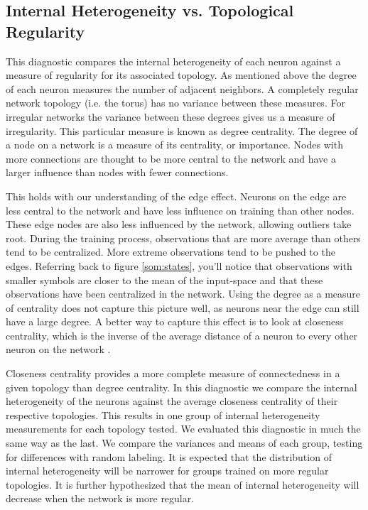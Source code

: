 \subsection{Internal Heterogeneity vs. Topological Regularity}
This diagnostic compares the internal heterogeneity of each neuron against a
measure of regularity for its associated topology.  As mentioned above the
degree of each neuron measures the number of adjacent neighbors.  A completely
regular network topology (i.e. the torus) has no variance between these
measures.  For irregular networks the variance between these degrees gives us
a measure of irregularity. This particular measure is known as degree
centrality.  The degree of a node on a network is a measure of its centrality, or
importance. Nodes with more connections are thought to be more central to the
network and have a larger influence than nodes with fewer connections.

This holds with our understanding of the edge effect.  Neurons on the edge are
less central to the network and have less influence on training than other nodes.  These
edge nodes are also less influenced by the network, allowing outliers take
root.  During the training process, observations that are more average than
others tend to be centralized.  More extreme observations tend to be pushed to
the edges.  Referring back to figure \ref{som:states}, you'll notice
that observations with smaller symbols are closer to the mean of the
input-space and that these observations have been centralized in the network.
Using the degree as a measure of centrality does not capture this picture
well, as neurons near the edge can still have a large degree.  A better way to
capture this effect is to look at closeness centrality, which is the
inverse of the average distance of a neuron to every other neuron on the
network \citep{Wasserman:1994}.

Closeness centrality provides a more complete measure of connectedness in a
given topology than degree centrality.  In this diagnostic we compare the
internal heterogeneity of the neurons against the average closeness centrality
of their respective topologies.  This results in one group of internal
heterogeneity measurements for each topology tested.  We evaluated this
diagnostic in much the same way as the last.  We compare the variances and
means of each group, testing for differences with random labeling.  It is
expected that the distribution of internal heterogeneity will be narrower for
groups trained on more regular topologies.  It is further hypothesized that
the mean of internal heterogeneity will decrease when the network is more
regular.  %


